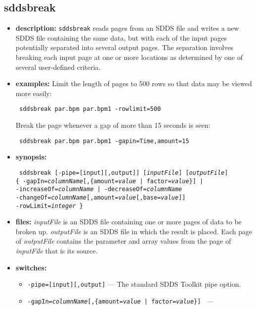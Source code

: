 
\newpage
\subsection{sddsbreak}
\label{sddsbreak}

\begin{itemize}
\item {\bf description:}
\verb|sddsbreak| reads pages from an SDDS file and writes a new SDDS file containing the same data,
but with each of the input pages potentially separated into several output pages.  The separation
involves breaking each input page at one or more locations as determined by one of several
user-defined criteria.
\item {\bf examples:}
Limit the length of pages to 500 rows so that data may be viewed more easily:
\begin{flushleft}{\tt
sddsbreak par.bpm par.bpm1 -rowlimit=500
}\end{flushleft}
Break the page whenever a gap of more than 15 seconds is seen:
\begin{flushleft}{\tt
sddsbreak par.bpm par.bpm1 -gapin=Time,amount=15
}\end{flushleft}
\item {\bf synopsis:} 
\begin{flushleft}{\tt
sddsbreak [-pipe=[input][,output]] [{\em inputFile}] [{\em outputFile}]\\
\{ -gapIn={\em columnName}[,\{amount={\em value} | factor={\em value}\}] |\\
 -increaseOf={\em columnName}  | -decreaseOf={\em columnName} \\
 -changeOf={\em columnName}[,amount={\em value}[,base={\em value}]] \\
  -rowLimit={\em integer} \}
}\end{flushleft}
\item {\bf files:}
{\em inputFile} is an SDDS file containing one or more pages of data to be broken up.
{\em outputFile} is an SDDS file in which the result is placed.  Each page of 
{\em outputFile} contains the parameter and array values from the page of {\em inputFile}
that is its source.
\item {\bf switches:}
    \begin{itemize}
    \item {\tt -pipe=[input][,output]} --- The standard SDDS Toolkit pipe option.
    \item {\tt -gapIn={\em columnName}[,\{amount={\em value} | factor={\em value}\}]  } --- 

\end{itemize}
\end{itemize}
